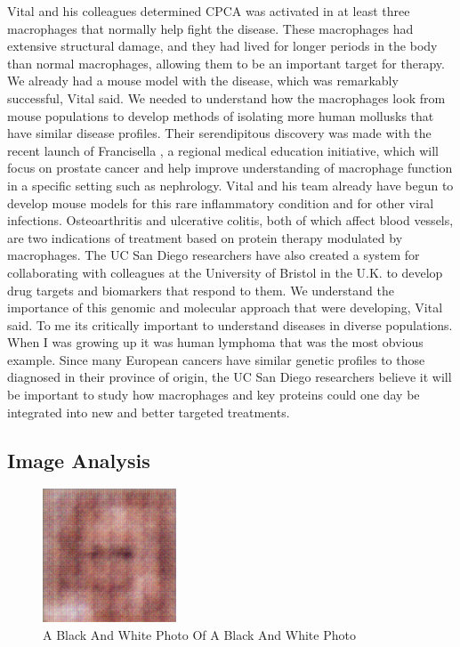 \documentclass{article}%
\begin{document}
Vital and his colleagues determined CPCA was activated in at least three macrophages that normally help fight the disease. These macrophages had extensive structural damage, and they had lived for longer periods in the body than normal macrophages, allowing them to be an important target for therapy.\newline%
We already had a mouse model with the disease, which was remarkably successful, Vital said. We needed to understand how the macrophages look from mouse populations to develop methods of isolating more human mollusks that have similar disease profiles.\newline%
Their serendipitous discovery was made with the recent launch of Francisella , a regional medical education initiative, which will focus on prostate cancer and help improve understanding of macrophage function in a specific setting such as nephrology.\newline%
Vital and his team already have begun to develop mouse models for this rare inflammatory condition and for other viral infections.\newline%
Osteoarthritis and ulcerative colitis, both of which affect blood vessels, are two indications of treatment based on protein therapy modulated by macrophages.\newline%
The UC San Diego researchers have also created a system for collaborating with colleagues at the University of Bristol in the U.K. to develop drug targets and biomarkers that respond to them.\newline%
We understand the importance of this genomic and molecular approach that were developing, Vital said. To me its critically important to understand diseases in diverse populations. When I was growing up it was human lymphoma that was the most obvious example.\newline%
Since many European cancers have similar genetic profiles to those diagnosed in their province of origin, the UC San Diego researchers believe it will be important to study how macrophages and key proteins could one day be integrated into new and better targeted treatments.

%
\subsection{Image Analysis}%
\label{subsec:ImageAnalysis}%


\begin{figure}[h!]%
\centering%
\includegraphics[width=150px]{500_fake_images/samples_5_7.png}%
\caption{A Black And White Photo Of A Black And White Photo}%
\end{figure}

%
\end{document}
